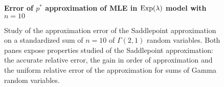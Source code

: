\begin{example}

    \begin{figure}[!htbp]
        \textbf{Error of $p^*$ approximation of MLE in ${\textrm{Exp}}(\lambda)$ model with $n=10$}
        \centering
        \caption{Study of the approximation error of the Saddlepoint approximation on a standardized sum of $n=10$ of $\Gamma(2, 1)$ random variables. Both panes expose properties studied of the Saddlepoint approximation: the accurate relative error, the gain in order of approximation and the uniform relative error of the approximation for sums of Gamma random variables.}
        \label{fig-pstar-approx}
    \end{figure}    


\end{example}
